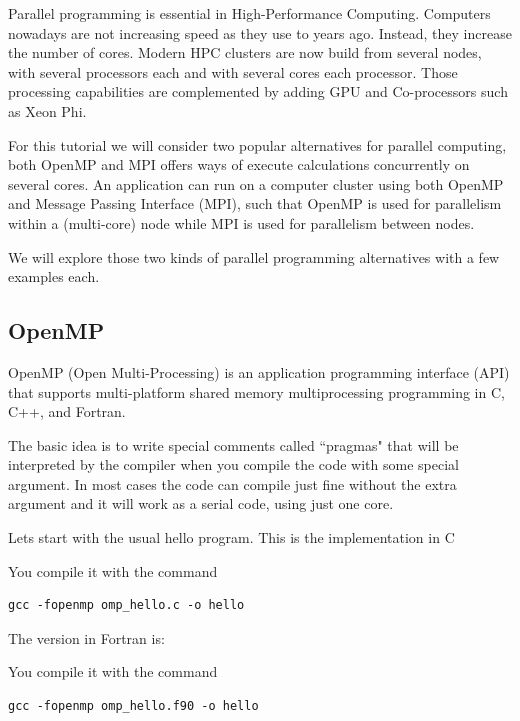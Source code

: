 Parallel programming is essential in High-Performance Computing. Computers nowadays are not increasing speed as they use to years ago.
Instead, they increase the number of cores.
Modern HPC clusters are now build from several nodes, with several processors each and with several cores each processor.
Those processing capabilities are complemented by adding GPU and Co-processors such as Xeon Phi.

For this tutorial we will consider two popular alternatives for parallel computing, both OpenMP and MPI offers ways of execute calculations concurrently on several cores.
An application can run on a computer cluster using both OpenMP and Message Passing Interface (MPI), such that OpenMP is used for parallelism within a (multi-core) node while MPI is used for parallelism between nodes.

We will explore those two kinds of parallel programming alternatives with a few examples each.

\subsection{OpenMP}

OpenMP (Open Multi-Processing) is an application programming interface (API) that supports multi-platform shared memory multiprocessing programming in C, C++, and Fortran.

The basic idea is to write special comments called ``pragmas" that will be interpreted by the compiler when you compile the code with some special argument. In most cases the code can compile just fine without the extra argument and it will work as a serial code, using just one core.

Lets start with the usual hello program. This is the implementation in C 



You compile it with the command

\begin{lstlisting}
gcc -fopenmp omp_hello.c -o hello
\end{lstlisting}

The version in Fortran is:



You compile it with the command

\begin{lstlisting}
gcc -fopenmp omp_hello.f90 -o hello
\end{lstlisting}


